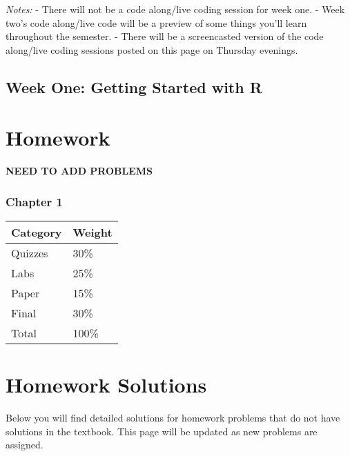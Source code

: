 \documentclass[
]{book}
\begin{document}
\emph{Notes:}
- There will not be a code along/live coding session for week one.
- Week two's code along/live code will be a preview of some things you'll learn throughout the semester.
- There will be a screencasted version of the code along/live coding sessions posted on this page on Thursday evenings.

\hypertarget{week-one-getting-started-with-r}{%
\section{Week One: Getting Started with R}\label{week-one-getting-started-with-r}}

\hypertarget{hw}{%
\chapter{Homework}\label{hw}}

\textbf{NEED TO ADD PROBLEMS }

\hypertarget{chapter-1-1}{%
\subsection{Chapter 1}\label{chapter-1-1}}

\begin{tabular}{l|l}
\hline
Category & Weight\\
\hline
Quizzes & 30\%\\
\hline
Labs & 25\%\\
\hline
Paper & 15\%\\
\hline
Final & 30\%\\
\hline
Total & 100\%\\
\hline
\end{tabular}

\hypertarget{hwsoln}{%
\chapter{Homework Solutions}\label{hwsoln}}

Below you will find detailed solutions for homework problems that do not have solutions in the textbook. This page will be updated as new problems are assigned.

  
\end{document}
